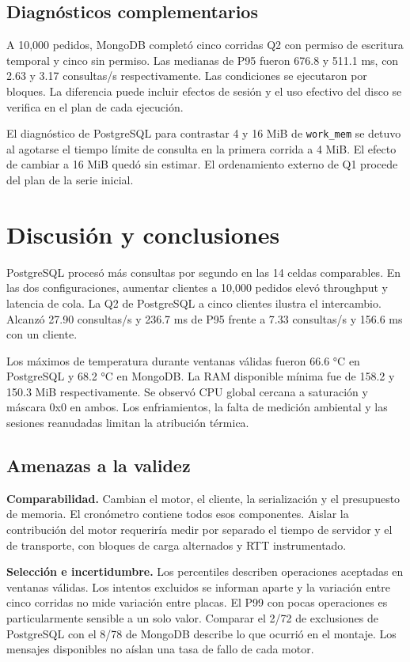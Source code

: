 \documentclass[10pt,a4paper]{article}
\newcommand{\clave}[1]{\texttt{#1}}
\begin{document}
\subsection{Diagnósticos complementarios}
A 10,000 pedidos, MongoDB completó cinco corridas Q2 con permiso de escritura temporal y cinco sin permiso. Las medianas de P95 fueron 676.8 y 511.1 ms, con 2.63 y 3.17 consultas/s respectivamente. Las condiciones se ejecutaron por bloques. La diferencia puede incluir efectos de sesión y el uso efectivo del disco se verifica en el plan de cada ejecución.

El diagnóstico de PostgreSQL para contrastar 4 y 16 MiB de \clave{work\_mem} se detuvo al agotarse el tiempo límite de consulta en la primera corrida a 4 MiB. El efecto de cambiar a 16 MiB quedó sin estimar. El ordenamiento externo de Q1 procede del plan de la serie inicial.

\section{Discusión y conclusiones}
PostgreSQL procesó más consultas por segundo en las 14 celdas comparables. En las dos configuraciones, aumentar clientes a 10,000 pedidos elevó throughput y latencia de cola. La Q2 de PostgreSQL a cinco clientes ilustra el intercambio. Alcanzó 27.90 consultas/s y 236.7 ms de P95 frente a 7.33 consultas/s y 156.6 ms con un cliente.

Los máximos de temperatura durante ventanas válidas fueron 66.6 °C en PostgreSQL y 68.2 °C en MongoDB. La RAM disponible mínima fue de 158.2 y 150.3 MiB respectivamente. Se observó CPU global cercana a saturación y máscara 0x0 en ambos. Los enfriamientos, la falta de medición ambiental y las sesiones reanudadas limitan la atribución térmica.

\subsection{Amenazas a la validez}
\textbf{Comparabilidad.} Cambian el motor, el cliente, la serialización y el presupuesto de memoria. El cronómetro contiene todos esos componentes. Aislar la contribución del motor requeriría medir por separado el tiempo de servidor y el de transporte, con bloques de carga alternados y RTT instrumentado.

\textbf{Selección e incertidumbre.} Los percentiles describen operaciones aceptadas en ventanas válidas. Los intentos excluidos se informan aparte y la variación entre cinco corridas no mide variación entre placas. El P99 con pocas operaciones es particularmente sensible a un solo valor. Comparar el 2/72 de exclusiones de PostgreSQL con el 8/78 de MongoDB describe lo que ocurrió en el montaje. Los mensajes disponibles no aíslan una tasa de fallo de cada motor.
\end{document}
